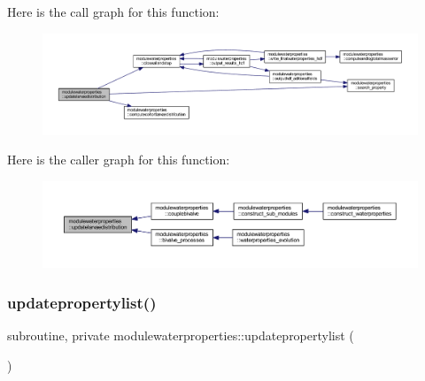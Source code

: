 Here is the call graph for this function\+:\nopagebreak
\begin{figure}[H]
\begin{center}
\leavevmode
\includegraphics[width=350pt]{namespacemodulewaterproperties_a9362aa51fad7e9cae9cd548057855662_cgraph}
\end{center}
\end{figure}
Here is the caller graph for this function\+:\nopagebreak
\begin{figure}[H]
\begin{center}
\leavevmode
\includegraphics[width=350pt]{namespacemodulewaterproperties_a9362aa51fad7e9cae9cd548057855662_icgraph}
\end{center}
\end{figure}
\mbox{\label{namespacemodulewaterproperties_a8ab7e6ee60b7c71bc6775c1586bd99b3}} 
\subsubsection{\texorpdfstring{updatepropertylist()}{updatepropertylist()}}
{\footnotesize\ttfamily subroutine, private modulewaterproperties\+::updatepropertylist (\begin{DoxyParamCaption}{ }\end{DoxyParamCaption})\hspace{0.3cm}{\ttfamily [private]}}

